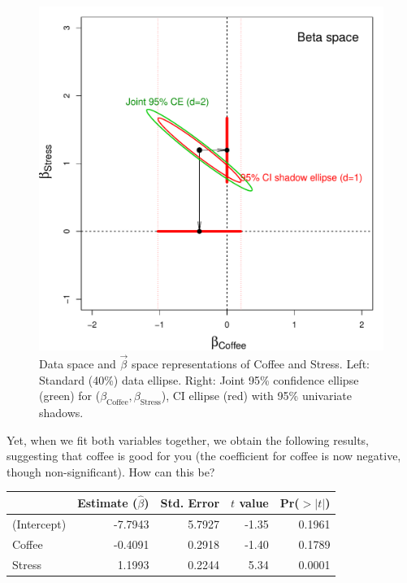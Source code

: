 \begin{figure}[htb]
\begin{minipage}[c]{.485\textwidth}
   \includegraphics[width=1\linewidth,clip]{fig/vis-reg-coffee12b}
  \end{minipage}
  \caption{Data space and $\vec{\beta}$ space representations of Coffee and Stress.
   Left: Standard (40\%) data ellipse. Right: Joint 95\% confidence ellipse (green) for
   ($\beta_{\mathrm{Coffee}}, \beta_{\mathrm{Stress}}$), CI ellipse (red) with 95\% univariate shadows.
  }%
  \label{fig:vis-reg-coffee12}
\end{figure}
Yet, when we fit both variables together, we obtain the following results,
suggesting that coffee is good for you (the coefficient for coffee is now
negative, though non-significant).  How can this be?

\begin{center}
\begin{tabular}{lrrrr}
 & Estimate ($\widehat{\beta}$) & Std. Error & $t$ value & Pr($>|t|$) \\ 
  \hline
(Intercept) & -7.7943 & 5.7927 & -1.35 & 0.1961 \\ 
  Coffee & -0.4091 & 0.2918 & -1.40 & 0.1789 \\ 
  Stress & 1.1993 & 0.2244 & 5.34 & 0.0001 \\ 
   \hline
\end{tabular}
\end{center}

